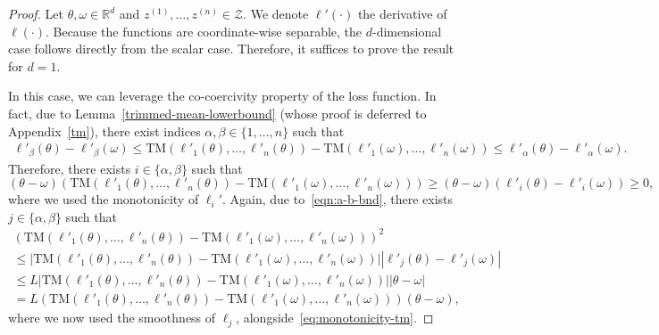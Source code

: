 \documentclass[twoside,11pt]{article}
\newcommand\mc{\mathcal}
\newcommand\mb{\mathbb}
\begin{document}
\begin{proof}
    Let $\theta, \omega \in \mb{R}^d$ and $z^{(1)}, \ldots, z^{(n)} \in \mc{Z}$. 
    We denote $\ell'(\cdot)$ the derivative of $\ell(\cdot)$.
    Because the functions are coordinate-wise separable, the $d$-dimensional case follows directly from the scalar case. 
    Therefore, it suffices to prove the result for $d=1$. 

    In this case, we can leverage the co-coercivity property of the loss function.
    In fact, due to Lemma~\ref{trimmed-mean-lowerbound} (whose proof is deferred to Appendix~\ref{tm}), there exist indices $\alpha, \beta \in \{1, \ldots, n \}$ such that
    \begin{align} 
        \ell'_\beta (\theta) - \ell'_\beta (\omega) \leq \mathrm{TM}(\ell'_1 (\theta), \ldots, \ell'_n (\theta)) - \mathrm{TM}(\ell'_1 (\omega), \ldots, \ell'_n (\omega)) \leq \ell'_\alpha (\theta) - \ell'_\alpha (\omega) . \label{eqn:a-b-bnd}
    \end{align}
    Therefore, there exists $i \in \{\alpha, \beta\}$ such that
    \begin{equation}\label{eq:monotonicity-tm}
        (\theta - \omega) \left( \mathrm{TM}(\ell'_1 (\theta), \ldots, \ell'_n (\theta)) - \mathrm{TM}(\ell'_1 (\omega), \ldots, \ell'_n (\omega)) \right) 
        \geq (\theta - \omega) (\ell'_i (\theta) - \ell'_i (\omega)) 
        \geq 0,
    \end{equation}
    where we used the monotonicity of $\ell_i'$. %
    Again, due to~\eqref{eqn:a-b-bnd}, there exists $j \in \{\alpha, \beta\}$ such that 
    \begin{multline*}
        \left( \mathrm{TM}(\ell'_1 (\theta), \ldots, \ell'_n (\theta)) - \mathrm{TM}(\ell'_1 (\omega), \ldots, \ell'_n (\omega)) \right)^2 \\
        \leq | \mathrm{TM}(\ell'_1 (\theta), \ldots, \ell'_n (\theta)) - \mathrm{TM}(\ell'_1 (\omega), \ldots, \ell'_n (\omega)) | | \ell'_j (\theta) - \ell'_j (\omega) | \\
        \leq L | \mathrm{TM}(\ell'_1 (\theta), \ldots, \ell'_n (\theta)) - \mathrm{TM}(\ell'_1 (\omega), \ldots, \ell'_n (\omega)) | | \theta - \omega | \\
        = L \left( \mathrm{TM}(\ell'_1 (\theta), \ldots, \ell'_n (\theta)) - \mathrm{TM}(\ell'_1 (\omega), \ldots, \ell'_n (\omega)) \right) \left( \theta - \omega \right), %
    \end{multline*}
    where we now used the smoothness of $\ell_j$, alongside~\eqref{eq:monotonicity-tm}. 
\end{proof}
\end{document}
